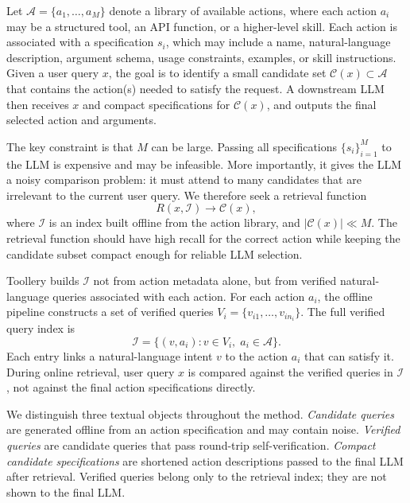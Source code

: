 Let $\mathcal{A} = \{a_1, \ldots, a_M\}$ denote a library of available actions, where each action $a_i$ may be a structured tool, an API function, or a higher-level skill. Each action is associated with a specification $s_i$, which may include a name, natural-language description, argument schema, usage constraints, examples, or skill instructions. Given a user query $x$, the goal is to identify a small candidate set $\mathcal{C}(x) \subset \mathcal{A}$ that contains the action(s) needed to satisfy the request. A downstream LLM then receives $x$ and compact specifications for $\mathcal{C}(x)$, and outputs the final selected action and arguments.

The key constraint is that $M$ can be large. Passing all specifications $\{s_i\}_{i=1}^{M}$ to the LLM is expensive and may be infeasible. More importantly, it gives the LLM a noisy comparison problem: it must attend to many candidates that are irrelevant to the current user query. We therefore seek a retrieval function
\begin{equation}
    R(x, \mathcal{I}) \rightarrow \mathcal{C}(x),
\end{equation}
where $\mathcal{I}$ is an index built offline from the action library, and $|\mathcal{C}(x)| \ll M$. The retrieval function should have high recall for the correct action while keeping the candidate subset compact enough for reliable LLM selection.

Toollery builds $\mathcal{I}$ not from action metadata alone, but from verified natural-language queries associated with each action. For each action $a_i$, the offline pipeline constructs a set of verified queries $V_i = \{v_{i1}, \ldots, v_{in_i}\}$. The full verified query index is
\begin{equation}
    \mathcal{I} = \{(v, a_i): v \in V_i,\; a_i \in \mathcal{A}\}.
\end{equation}
Each entry links a natural-language intent $v$ to the action $a_i$ that can satisfy it. During online retrieval, user query $x$ is compared against the verified queries in $\mathcal{I}$, not against the final action specifications directly.

We distinguish three textual objects throughout the method. \emph{Candidate queries} are generated offline from an action specification and may contain noise. \emph{Verified queries} are candidate queries that pass round-trip self-verification. \emph{Compact candidate specifications} are shortened action descriptions passed to the final LLM after retrieval. Verified queries belong only to the retrieval index; they are not shown to the final LLM.

